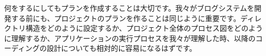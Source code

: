 何をするにしてもプランを作成することは大切です。我々がブログシステムを開発する前にも、プロジェクトのプランを作ることは同じように重要です。ディレクトリ構造をどのように設定するか、プロジェクト全体のプロセス図をどのように理解するか、アプリケーションの実行プロセスを我々が理解した時、以降のコーディングの設計についても相対的に容易になるはずです。
